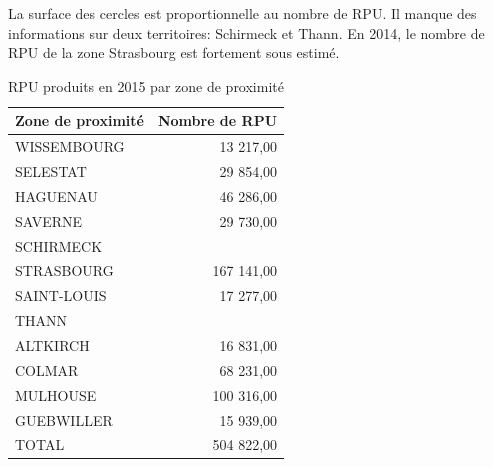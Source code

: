 \documentclass[]{article}
\begin{document}
La surface des cercles est proportionnelle au nombre de RPU. Il manque
des informations sur deux territoires: Schirmeck et Thann. En 2014, le
nombre de RPU de la zone Strasbourg est fortement sous estimé.

\begin{table}[ht]
\centering
\begin{tabular}{lr}
  \hline
Zone de proximité & Nombre de RPU \\ 
  \hline
WISSEMBOURG & 13 217,00 \\ 
  SELESTAT & 29 854,00 \\ 
  HAGUENAU & 46 286,00 \\ 
  SAVERNE & 29 730,00 \\ 
  SCHIRMECK &  \\ 
  STRASBOURG & 167 141,00 \\ 
  SAINT-LOUIS & 17 277,00 \\ 
  THANN &  \\ 
  ALTKIRCH & 16 831,00 \\ 
  COLMAR & 68 231,00 \\ 
  MULHOUSE & 100 316,00 \\ 
  GUEBWILLER & 15 939,00 \\ 
   \hline
TOTAL & 504 822,00 \\ 
  \end{tabular}
\caption{RPU produits en 2015 par zone de proximité} 
\end{table}
\end{document}
